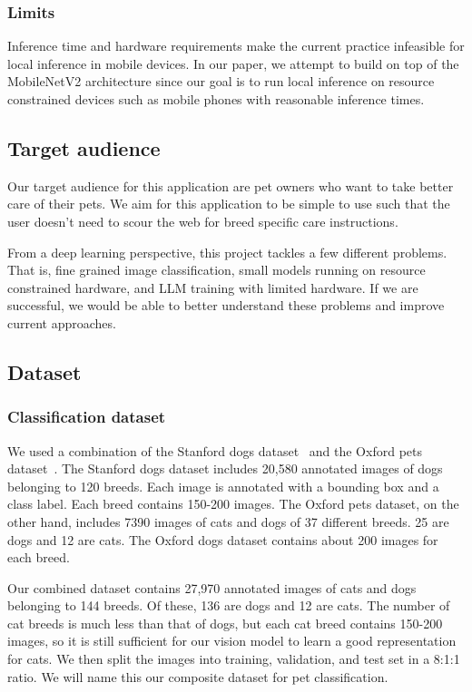 \documentclass[10pt,twocolumn,letterpaper]{article}
\begin{document}
\subsubsection{Limits}
Inference time and hardware requirements make the current practice infeasible for local inference in mobile devices. In our paper, we attempt to build on top of the MobileNetV2 architecture since our goal is to run local inference on resource constrained devices such as mobile phones with reasonable inference times.

\subsection{Target audience}
Our target audience for this application are pet owners who want to take better care of their pets. We aim for this application to be simple to use such that the user doesn't need to scour the web for breed specific care instructions.

From a deep learning perspective, this project tackles a few different problems. That is, fine grained image classification, small models running on resource constrained hardware, and LLM training with limited hardware. If we are successful, we would be able to better understand these problems and improve current approaches.

\subsection{Dataset}
\subsubsection{Classification dataset}
We used a combination of the Stanford dogs dataset~\cite{khosla2011novel} and the Oxford pets dataset~\cite{6248092}. The Stanford dogs dataset includes 20,580 annotated images of dogs belonging to 120 breeds. Each image is annotated with a bounding box and a class label. Each breed contains 150-200 images. The Oxford pets dataset, on the other hand, includes 7390 images of cats and dogs of 37 different breeds. 25 are dogs and 12 are cats. The Oxford dogs dataset contains about 200 images for each breed.

Our combined dataset contains 27,970 annotated images of cats and dogs belonging to 144 breeds. Of these, 136 are dogs and 12 are cats. The number of cat breeds is much less than that of dogs, but each cat breed contains 150-200 images, so it is still sufficient for our vision model to learn a good representation for cats. We then split the images into training, validation, and test set in a 8:1:1 ratio. We will name this our composite dataset for pet classification.
\end{document}
